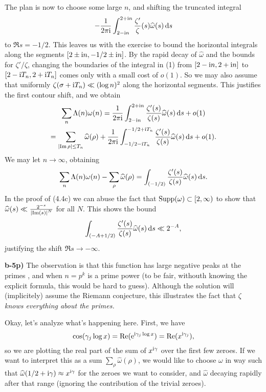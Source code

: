 \documentclass[a4paper,11pt]{article}
\begin{document}
    The plan is now to choose some large $n$, and 
    shifting the truncated integral 
    \begin{equation}
        -\frac{1}{2 \pi \mathrm i} \int_{2-\mathrm i n}^{2+ \mathrm i n} \frac{\zeta'}{\zeta}(s) \widehat \omega(s)
        \mathrm{\,d} s
    \end{equation}
    to $\Re s = -1/2$. This leaves us with the exercise to bound the horizontal
    integrals along the segments $[2\pm \mathrm i n, -1/2 \pm \mathrm i n]$. By the rapid decay
    of $\hat \omega$ and the bounds for $\zeta'/\zeta$, changing the boundaries
    of the integral in (1) from $[2-\mathrm i n, 2 + \mathrm i n]$ to $[2 - \mathrm i T_n, 2 +
    \mathrm i T_n]$ comes only with a small cost of $o(1)$. So we may also assume that
    uniformly $\zeta(\sigma + \mathrm i T_n) \ll (\log n)^2$ along the horizontal segments. 
    This justifies the first contour shift, and we obtain
    \begin{multline*}
        \sum_n \Lambda(n) \omega(n) = \frac{1}{2 \pi \mathrm i} \int_{2- \mathrm i n}^{2 + \mathrm i n} 
        \frac{\zeta'(s)}{\zeta(s)} \widehat \omega(s) \mathrm{\,d} s + o(1) \\
        = \sum_{\left\lvert \operatorname{Im} \rho \right\rvert \leq T_n} \widehat \omega(\rho)
        + \frac{1}{2 \pi \mathrm i} \int_{-1/2 - \mathrm i T_n}^{-1/2 + \mathrm i T_n}
        \frac{\zeta'(s)}{\zeta(s)} \widehat \omega(s) \mathrm{\,d} s + o(1).
    \end{multline*}
    We may let $n \to \infty$, obtaining 
    \[
        \sum_n \Lambda(n) \omega(n) - \sum_\rho \widehat \omega(\rho)
         = \int_{(-1/2)}  \frac{\zeta'(s)}{\zeta(s)} \widehat \omega(s) \mathrm{\,d} s.
    \]
    In the proof of (4.4c) we can abuse the fact that $\operatorname{Supp}(\omega) \subset
    [2, \infty)$ to show that $\widehat \omega(s) \ll \frac{2^{-s}}{\left\lvert \operatorname{Im}(s) \right\rvert^N}$
    for all $N$. This shows the bound
    \[
        \int_{(-A+1/2)}  \frac{\zeta'(s)}{\zeta(s)} \widehat \omega(s) \mathrm{\,d} s
        \ll 2^{-A},
    \]
    justifying the shift $\Re s \to -\infty$.

\textbf{b-5p)}
The observation is that this function has large negative peaks at the primes
, and when $n=p^k$ is a prime power (to be fair, withouth knowing the 
explicit formula, this would be hard to guess). Although 
the solution will (implicitely) assume the Riemann conjecture, this illustrates
the fact that \textit{$\zeta$ knows everything about the primes.}

Okay, let's analyze what's happening here. First, we have 
\[
    \cos(\gamma_j \log x) = \operatorname{Re}(\mathrm e^{\mathrm i \gamma_j \log x}) = \operatorname{Re}(x^{\mathrm i \gamma_j}),
\]
so we are plotting the real part of the sum of $x^{\mathrm i \gamma}$ over the first few
zeroes. If we want to interpret this as a sum $\sum_\rho \hat \omega(\rho)$, 
we would like to choose $\omega$ in way such that $\widehat \omega(1/2 + \mathrm i \gamma)
\approx x^{\mathrm i \gamma}$ for the zeroes we want to consider, and $\hat \omega$ 
decaying rapidly after that range (ignoring the contribution of the trivial zeroes).
\end{document}
